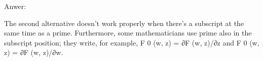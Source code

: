 Anwer:

The second alternative doesn’t work properly when there’s a subscript at the
same time as a prime. Furthermore, some mathematicians use prime also in the
subscript position; they write, for example, F 0 (w, z) = ∂F (w, z)/∂z and F 0 (w, z) =
∂F (w, z)/∂w.

\bye


